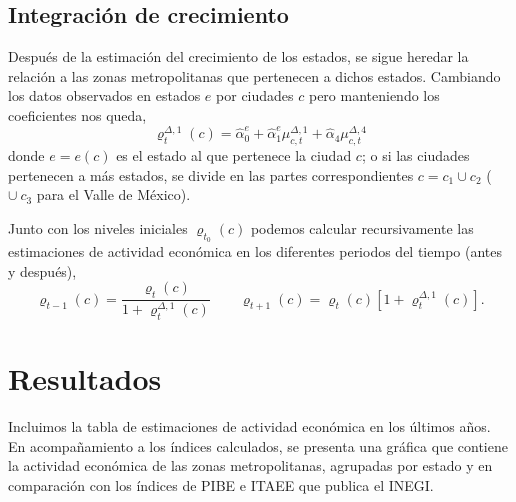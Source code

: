 \documentclass[]{article}
\begin{document}
\subsection{Integración de
crecimiento}\label{integracion-de-crecimiento}

Después de la estimación del crecimiento de los estados, se sigue
heredar la relación a las zonas metropolitanas que pertenecen a dichos
estados. Cambiando los datos observados en estados \(e\) por ciudades
\(c\) pero manteniendo los coeficientes nos queda,
\[ \varrho_{t}^{\Delta,1}(c) = \hat\alpha_0^e + 
      \hat\alpha_1^e\mu_{c,t}^{\Delta,1} +
      \hat\alpha_4\mu_{c,t}^{\Delta,4} \] donde \(e = e(c)\) es el
estado al que pertenece la ciudad \(c\); o si las ciudades pertenecen a
más estados, se divide en las partes correspondientes \(c=c_1\cup c_2\)
(\(\cup\ c_3\) para el Valle de México).

Junto con los niveles iniciales \(\varrho_{t_0}(c)\) podemos calcular
recursivamente las estimaciones de actividad económica en los diferentes
periodos del tiempo (antes y después),
\[ \varrho_{t-1}(c) = \frac{\varrho_t(c)}{1 + \varrho_t^{\Delta,1}(c)}
      \qquad
      \varrho_{t+1}(c) = \varrho_t(c)[1 + \varrho_t^{\Delta,1}(c)].\]

\section{Resultados}\label{resultados}

Incluimos la tabla de estimaciones de actividad económica en los últimos
años. En acompañamiento a los índices calculados, se presenta una
gráfica que contiene la actividad económica de las zonas metropolitanas,
agrupadas por estado y en comparación con los índices de PIBE e ITAEE
que publica el INEGI.
\end{document}
